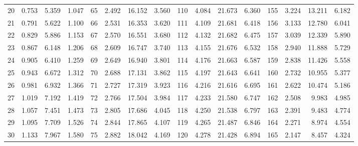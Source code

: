 \begin{table}[!h]
{\begin{tabular}{rrrr|rrrr|rrrr|rrrr}
 20 & \tiny{  0.753} &   5.359 & \tiny{  1.047} &  65 & \tiny{  2.492} &  16.152 & \tiny{  3.560} & 110 & \tiny{  4.084} &  21.673 & \tiny{  6.360} & 155 & \tiny{  3.224} &  13.211 & \tiny{  6.182}\\
 21 & \tiny{  0.791} &   5.622 & \tiny{  1.100} &  66 & \tiny{  2.531} &  16.353 & \tiny{  3.620} & 111 & \tiny{  4.109} &  21.681 & \tiny{  6.418} & 156 & \tiny{  3.133} &  12.780 & \tiny{  6.041}\\
 22 & \tiny{  0.829} &   5.886 & \tiny{  1.153} &  67 & \tiny{  2.570} &  16.551 & \tiny{  3.680} & 112 & \tiny{  4.132} &  21.682 & \tiny{  6.475} & 157 & \tiny{  3.039} &  12.339 & \tiny{  5.890}\\
 23 & \tiny{  0.867} &   6.148 & \tiny{  1.206} &  68 & \tiny{  2.609} &  16.747 & \tiny{  3.740} & 113 & \tiny{  4.155} &  21.676 & \tiny{  6.532} & 158 & \tiny{  2.940} &  11.888 & \tiny{  5.729}\\
 24 & \tiny{  0.905} &   6.410 & \tiny{  1.259} &  69 & \tiny{  2.649} &  16.940 & \tiny{  3.801} & 114 & \tiny{  4.176} &  21.663 & \tiny{  6.587} & 159 & \tiny{  2.838} &  11.426 & \tiny{  5.558}\\
 25 & \tiny{  0.943} &   6.672 & \tiny{  1.312} &  70 & \tiny{  2.688} &  17.131 & \tiny{  3.862} & 115 & \tiny{  4.197} &  21.643 & \tiny{  6.641} & 160 & \tiny{  2.732} &  10.955 & \tiny{  5.377}\\
 26 & \tiny{  0.981} &   6.932 & \tiny{  1.366} &  71 & \tiny{  2.727} &  17.319 & \tiny{  3.923} & 116 & \tiny{  4.216} &  21.616 & \tiny{  6.695} & 161 & \tiny{  2.622} &  10.474 & \tiny{  5.186}\\
 27 & \tiny{  1.019} &   7.192 & \tiny{  1.419} &  72 & \tiny{  2.766} &  17.504 & \tiny{  3.984} & 117 & \tiny{  4.233} &  21.580 & \tiny{  6.747} & 162 & \tiny{  2.508} &   9.983 & \tiny{  4.985}\\
 28 & \tiny{  1.057} &   7.451 & \tiny{  1.473} &  73 & \tiny{  2.805} &  17.686 & \tiny{  4.045} & 118 & \tiny{  4.250} &  21.538 & \tiny{  6.797} & 163 & \tiny{  2.391} &   9.483 & \tiny{  4.774}\\
 29 & \tiny{  1.095} &   7.709 & \tiny{  1.526} &  74 & \tiny{  2.844} &  17.865 & \tiny{  4.107} & 119 & \tiny{  4.265} &  21.487 & \tiny{  6.846} & 164 & \tiny{  2.271} &   8.974 & \tiny{  4.554}\\
 30 & \tiny{  1.133} &   7.967 & \tiny{  1.580} &  75 & \tiny{  2.882} &  18.042 & \tiny{  4.169} & 120 & \tiny{  4.278} &  21.428 & \tiny{  6.894} & 165 & \tiny{  2.147} &   8.457 & \tiny{  4.324}\\

\end{tabular}}
\end{table}

